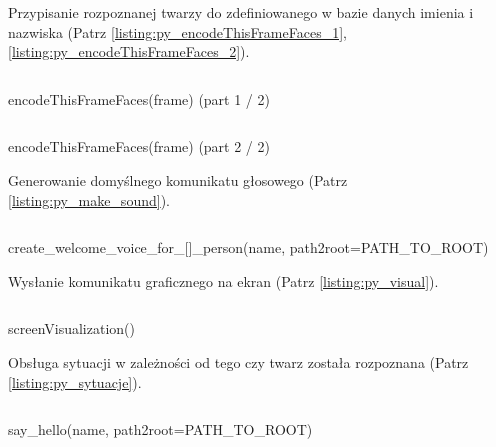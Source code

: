 \documentclass[a4paper,12pt,reqno]{article}
\begin{document}
\newpage
Przypisanie rozpoznanej twarzy do zdefiniowanego w bazie danych imienia i nazwiska (Patrz \ref{listing:py_encodeThisFrameFaces_1}, \ref{listing:py_encodeThisFrameFaces_2}).
\begin{listing}[H]%
\begin{mdframed}[backgroundcolor=codebg]
\inputminted{python}{code/encodeThisFrameFaces_1.py}
\end{mdframed}
\caption{encodeThisFrameFaces(frame) (part 1 / 2)}
\label{listing:py_encodeThisFrameFaces_1}
\end{listing}

\begin{listing}[H]%
\begin{mdframed}[backgroundcolor=codebg]
\inputminted{python}{code/encodeThisFrameFaces_2.py}
\end{mdframed}
\caption{encodeThisFrameFaces(frame) (part 2 / 2)}
\label{listing:py_encodeThisFrameFaces_2}
\end{listing}

\newpage
Generowanie domyślnego komunikatu głosowego  (Patrz \ref{listing:py_make_sound}).
\begin{listing}[H]%
\begin{mdframed}[backgroundcolor=codebg]
\inputminted{python}{code/create_welcome_voice_for_some_person.py}
\end{mdframed}
\caption{create\_welcome\_voice\_for\_[]\_person(name, path2root=PATH\_TO\_ROOT)}
\label{listing:py_make_sound}
\end{listing}

\newpage
Wysłanie komunikatu graficznego na ekran (Patrz \ref{listing:py_visual}).
\begin{listing}[H]%
\begin{mdframed}[backgroundcolor=codebg]
\inputminted{python}{code/screenVisualization.py}
\end{mdframed}
\caption{screenVisualization()}
\label{listing:py_visual}
\end{listing}

\newpage
Obsługa sytuacji w zależności od tego czy twarz została rozpoznana  (Patrz \ref{listing:py_sytuacje}).
\begin{listing}[H]%
\begin{mdframed}[backgroundcolor=codebg]
\inputminted{python}{code/say_hello_what_action.py}
\end{mdframed}
\caption{say\_hello(name, path2root=PATH\_TO\_ROOT)}
\label{listing:py_sytuacje}
\end{listing}
\end{document}
